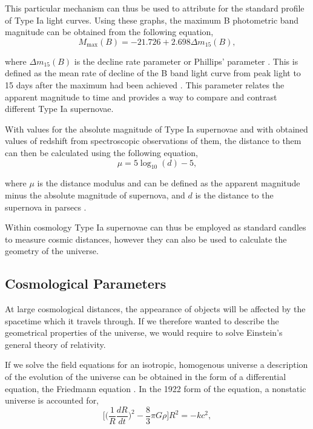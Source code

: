 \documentclass[twocolumn]{revtex4}
\begin{document}
This particular mechanism can thus be used to attribute for the standard profile of Type Ia light curves. Using these graphs, the maximum B photometric band magnitude can be obtained from the following equation,
\begin{equation}
M_{\max}(B)=-21.726+2.698\Delta m_{15}(B),
\end{equation}

where $\Delta m_{15}(B)$ is the decline rate parameter or Phillips' parameter \cite{high_en_astro}. This is defined as the mean rate of decline of the B band light curve from peak light to 15 days after the maximum had been achieved \cite{abs_phil}. This parameter relates the apparent magnitude to time and provides a way to compare and contrast different Type Ia supernovae. 

With values for the absolute magnitude of Type Ia supernovae and with obtained values of redshift from spectroscopic observations of them, the distance to them can then be calculated using the following equation, 
\begin{equation}
\mu = 5 \log_{10}(d) - 5,
\end{equation}

where $\mu$ is the distance modulus and can be defined as the apparent magnitude minus the absolute magnitude of supernova, and $d$ is the distance to the supernova in parsecs \cite{mod_ast}. 

Within cosmology Type Ia supernovae can thus be employed as standard candles to measure cosmic distances, however they can also be used to calculate the geometry of the universe.

\vspace{-3ex}
\subsection{Cosmological Parameters}
\vspace{-2ex}
At large cosmological distances, the appearance of objects will be affected by the spacetime which it travels through. If we therefore wanted to describe the geometrical properties of the universe, we would require to solve Einstein's general theory of relativity.

If we solve the field equations for an isotropic, homogenous universe a description of the evolution of the universe can be obtained in the form of a differential equation, the Friedmann equation \cite{mod_ast}. In the 1922 form of the equation, a nonstatic universe is accounted for,
\begin{equation}
\Big[ \Big( \frac{1}{R} \frac{dR}{dt} \Big)^2 - \frac{8}{3} \pi G \rho \Big] R^2 = -k c^2,
\end{equation}
\end{document}
